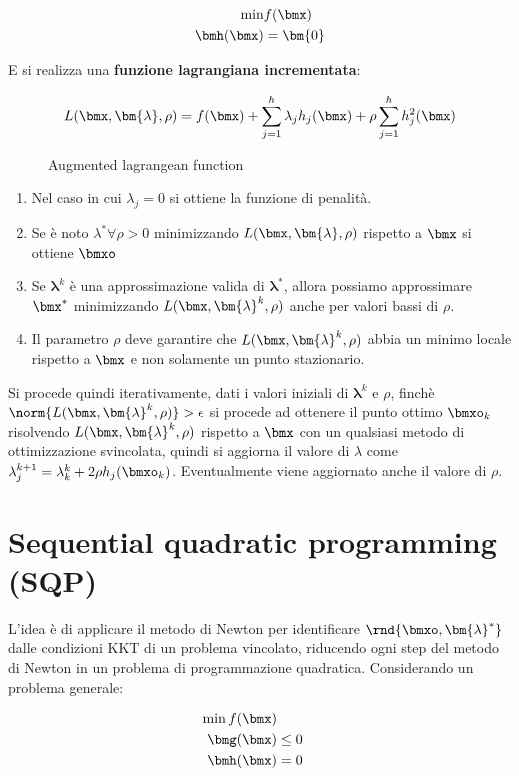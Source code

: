 \documentclass[\main/main.tex]{subfiles}
\begin{document}
\begin{align*}
    \min &f(\bmx)\\
    \bmh(\bmx) &= \bm{0}
\end{align*}

E si realizza una \textbf{funzione lagrangiana incrementata}:

\begin{figure}
\[
    L(\bmx, \bm{\lambda}, \rho) = f(\bmx) + \sum_{j=1}^h \lambda_j h_j(\bmx) + \rho\sum_{j=1}^h h_j^2(\bmx)
\]
\caption{Augmented lagrangean function}
\end{figure}

\begin{enumerate}
    \item Nel caso in cui \(\lambda_j=0\) si ottiene la funzione di penalità.
    \item Se è noto \(\lambda^* \forall \rho > 0\) minimizzando \(L(\bmx, \bm{\lambda}, \rho)\) rispetto a \(\bmx \) si ottiene \(\bmxo \)
    \item Se \(\bm{\lambda}^k\) è una approssimazione valida di \(\bm{\lambda}^*\), allora possiamo approssimare \(\bmx^*\) minimizzando \(L(\bmx, \bm{\lambda}^k, \rho)\) anche per valori bassi di \(\rho \).
    \item Il parametro \(\rho \) deve garantire che \(L(\bmx, \bm{\lambda}^k, \rho)\) abbia un minimo locale rispetto a \(\bmx \) e non solamente un punto stazionario.
\end{enumerate}

Si procede quindi iterativamente, dati i valori iniziali di \(\bm{\lambda}^k\) e \(\rho \), finchè \(\norm{L(\bmx, \bm{\lambda}^k, \rho)} > \epsilon \) si procede ad ottenere il punto ottimo \(\bmxo_k\) risolvendo \(L(\bmx, \bm{\lambda}^k, \rho)\) rispetto a \(\bmx \) con un qualsiasi metodo di ottimizzazione svincolata, quindi si aggiorna il valore di \(\lambda \) come \(\lambda_j^{k+1} = \lambda_k^k + 2\rho h_j(\bmxo_k)\). Eventualmente viene aggiornato anche il valore di \(\rho \).

\section{Sequential quadratic programming (SQP)}
L'idea è di applicare il metodo di Newton per identificare \(\rnd{\bmxo, \bm{\lambda}^*}\) dalle condizioni KKT di un problema vincolato, riducendo ogni step del metodo di Newton in un problema di programmazione quadratica. Considerando un problema generale:

\begin{align*}
    \min f(\bmx)\\
    \bmg(\bmx) &\leq 0\\
    \bmh(\bmx) &= 0\\
\end{align*}
\end{document}
